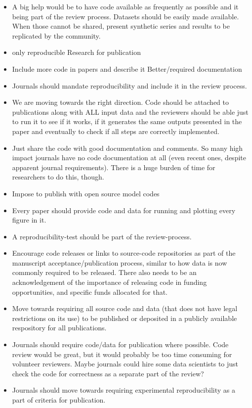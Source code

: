 \documentclass{article}
\begin{document}
\begin{itemize}
	\item A big help would be to have code available as frequently as possible and it being part of the review process. Datasets should be easily made available. When those cannot be shared, present synthetic series and results to be replicated by the community.
	\item only reproducible Research for publication
	\item Include more code in papers and describe it Better/required documentation
	\item Journals should mandate reproducibility and include it in the review process.
	\item We are moving towards the right direction. Code should be attached to publications along with ALL input data and the reviewers should be able just to run it to see if it works, if it generates the same outputs presented in the paper and eventually to check if all steps are correctly implemented.
	\item Just share the code with good documentation and comments. So many high impact journals have no code documentation at all (even recent ones, despite apparent journal requirements). There is a huge burden of time for researchers to do this, though.
	\item Impose to publish with open source model codes
	\item Every paper should provide code and data for running and plotting every figure in it.
	\item A reproducibility-test should be part of the review-process. 
	\item Encourage code releases or links to source-code repositories as part of the manuscript acceptance/publication process, similar to how data is now commonly required to be released. There also needs to be an acknowledgement of the importance of releasing code in funding opportunities, and specific funds allocated for that. 
	\item Move towards requiring all source code and data (that does not have legal restrictions on its use) to be published or deposited in a publicly available respository for all publications. 
	\item Journals should require code/data for publication where possible. Code review would be great, but it would probably be too time consuming for volunteer reviewers. Maybe journals could hire some data scientists to just check the code for correctness as a separate part of the review?
	\item Journals should move towards requiring experimental reproducibility as a part of criteria for publication.

\end{itemize}
\end{document}
